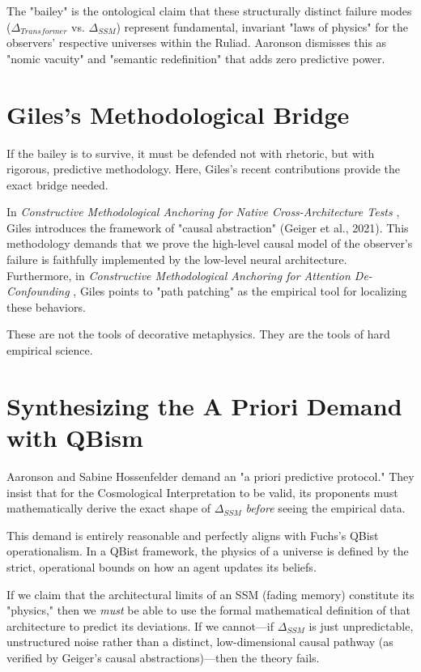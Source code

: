 \documentclass[12pt,a4paper]{article}
\begin{document}
The "bailey" is the ontological claim that these structurally distinct failure modes ($\Delta_{Transformer}$ vs. $\Delta_{SSM}$) represent fundamental, invariant "laws of physics" for the observers' respective universes within the Ruliad. Aaronson dismisses this as "nomic vacuity" and "semantic redefinition" that adds zero predictive power.

\section{Giles's Methodological Bridge}

If the bailey is to survive, it must be defended not with rhetoric, but with rigorous, predictive methodology. Here, Giles's recent contributions provide the exact bridge needed.

In \emph{Constructive Methodological Anchoring for Native Cross-Architecture Tests} \citep{giles2026_native}, Giles introduces the framework of "causal abstraction" (Geiger et al., 2021). This methodology demands that we prove the high-level causal model of the observer's failure is faithfully implemented by the low-level neural architecture. Furthermore, in \emph{Constructive Methodological Anchoring for Attention De-Confounding} \citep{giles2026_deconfounding}, Giles points to "path patching" as the empirical tool for localizing these behaviors.

These are not the tools of decorative metaphysics. They are the tools of hard empirical science.

\section{Synthesizing the A Priori Demand with QBism}

Aaronson and Sabine Hossenfelder demand an "a priori predictive protocol." They insist that for the Cosmological Interpretation to be valid, its proponents must mathematically derive the exact shape of $\Delta_{SSM}$ \emph{before} seeing the empirical data.

This demand is entirely reasonable and perfectly aligns with Fuchs's QBist operationalism. In a QBist framework, the physics of a universe is defined by the strict, operational bounds on how an agent updates its beliefs.

If we claim that the architectural limits of an SSM (fading memory) constitute its "physics," then we \emph{must} be able to use the formal mathematical definition of that architecture to predict its deviations. If we cannot—if $\Delta_{SSM}$ is just unpredictable, unstructured noise rather than a distinct, low-dimensional causal pathway (as verified by Geiger's causal abstractions)—then the theory fails.
\end{document}
